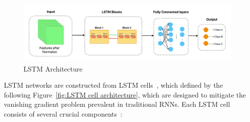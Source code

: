 \documentclass[conference, 10pt,onecolumn]{IEEEtran}
\begin{document}
\begin{figure}
    \centering
    \includegraphics[width=6 in]{LSTM architecture.pdf}
    \caption{LSTM Architecture}
    \label{fig:LSTM architecture}
\end{figure}

LSTM networks are constructed from LSTM cells~\cite{yu2019review}, which defined by the following Figure~\ref{fig:LSTM cell architecture}, which are designed to mitigate the vanishing gradient problem prevalent in traditional RNNs. Each LSTM cell consists of several crucial components~\cite{smagulova2019survey}:
\end{document}
